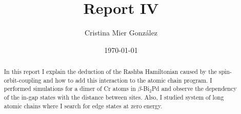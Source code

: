 \documentclass[letterpaper,12pt]{article}
\begin{document}
\title{Report IV}
\author{Cristina Mier Gonz\'alez}
\date{\today}
\maketitle

\begin{abstract}
In this report I explain the deduction of the Rashba Hamiltonian caused by the spin-orbit-coupling and how to add this interaction to the atomic chain program. I performed simulations for a dimer of Cr atoms in $\beta$-Bi$_2$Pd and observe the dependency of the in-gap states with the distance between sites. Also, I studied system of long atomic chains where I search for  edge states at zero energy.

\end{abstract}
\end{document}
